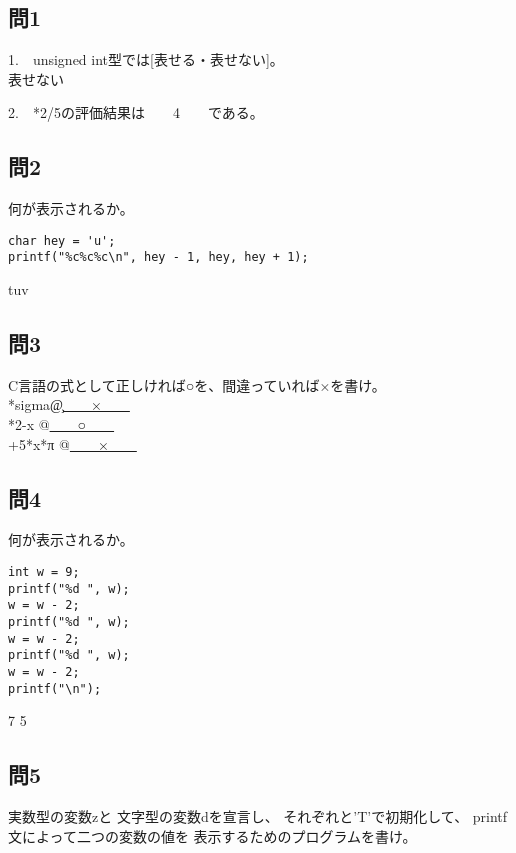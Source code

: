 \documentclass[a4j]{jarticle}
\def\an#1{\phantom{#1}}
\def\an#1{{#1}}
\begin{document}
\begin{multicols*}{2}
\subsection*{問1}

1.　unsigned int型で{}は[表せる・表せない]。\\

\an{表せない}


2.　{*2/5}の評価結果は　　\an{4}　　である。



\subsection*{問2}

何が表示されるか。
\begin{verbatim}
char hey = 'u';
printf("%c%c%c\n", hey - 1, hey, hey + 1);
\end{verbatim}
\an{{\ttfamily tuv}}



\subsection*{問3}


C言語の式として正しければ○を、間違っていれば×を書け。\\
*sigma\c           @\underline{\an{　　×　　}}\\
\verb@OutputResult*2-x     @\underline{\an{　　○　　}}\\
+5*x*π            @\underline{\an{　　×　　}}\\



\subsection*{問4}

何が表示されるか。
\begin{verbatim}
int w = 9;
printf("%d ", w);
w = w - 2;
printf("%d ", w);
w = w - 2;
printf("%d ", w);
w = w - 2;
printf("\n");
\end{verbatim}
\an{{ 7 5}}



\subsection*{問5}



実数型の変数{\ttfamily z}と
文字型の変数{\ttfamily d}を宣言し、
それぞれ{}と{\ttfamily 'T'}で初期化して、
{\ttfamily printf}文によって二つの変数の値を
表示するためのプログラムを書け。


\end{multicols*}
\end{document}
